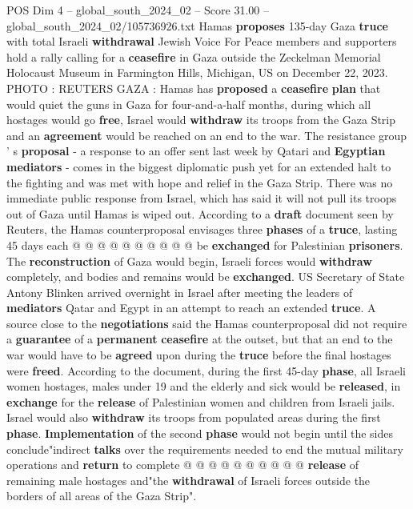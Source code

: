 \begin{textsample}{POS Dim 4 – global\_south\_2024\_02 – Score 31.00 – global\_south\_2024\_02/105736926.txt}  \label{ex:f4_pos_071}
Hamas \textbf{proposes} 135-day Gaza \textbf{truce} with total Israeli \textbf{withdrawal} Jewish Voice For Peace members and supporters hold a rally calling for a \textbf{ceasefire} in Gaza outside the Zeckelman Memorial Holocaust Museum in Farmington Hills, Michigan, US on December 22, 2023.
PHOTO : REUTERS GAZA : Hamas has \textbf{proposed} a \textbf{ceasefire} \textbf{plan} that would quiet the guns in Gaza for four-and-a-half months, during which all hostages would go \textbf{free}, Israel would \textbf{withdraw} its troops from the Gaza Strip and an \textbf{agreement} would be reached on an end to the war.
The resistance group ' s \textbf{proposal} - a response to an offer sent last week by Qatari and \textbf{Egyptian} \textbf{mediators} - comes in the biggest diplomatic push yet for an extended halt to the fighting and was met with hope and relief in the Gaza Strip.
There was no immediate public response from Israel, which has said it will not pull its troops out of Gaza until Hamas is wiped out.
According to a \textbf{draft} document seen by Reuters, the Hamas counterproposal envisages three \textbf{phases} of a \textbf{truce}, lasting 45 days each @ @ @ @ @ @ @ @ @ @ be \textbf{exchanged} for Palestinian \textbf{prisoners}.
The \textbf{reconstruction} of Gaza would begin, Israeli forces would \textbf{withdraw} completely, and bodies and remains would be \textbf{exchanged}.
US Secretary of State Antony Blinken arrived overnight in Israel after meeting the leaders of \textbf{mediators} Qatar and Egypt in an attempt to reach an extended \textbf{truce}.
A source close to the \textbf{negotiations} said the Hamas counterproposal did not require a \textbf{guarantee} of a \textbf{permanent} \textbf{ceasefire} at the outset, but that an end to the war would have to be \textbf{agreed} upon during the \textbf{truce} before the final hostages were \textbf{freed}.
According to the document, during the first 45-day \textbf{phase}, all Israeli women hostages, males under 19 and the elderly and sick would be \textbf{released}, in \textbf{exchange} for the \textbf{release} of Palestinian women and children from Israeli jails.
Israel would also \textbf{withdraw} its troops from populated areas during the first \textbf{phase}. \textbf{Implementation} of the second \textbf{phase} would not begin until the sides conclude"indirect \textbf{talks} over the requirements needed to end the mutual military operations and \textbf{return} to complete @ @ @ @ @ @ @ @ @ @ \textbf{release} of remaining male hostages and"the \textbf{withdrawal} of Israeli forces outside the borders of all areas of the Gaza Strip".

\end{textsample}
